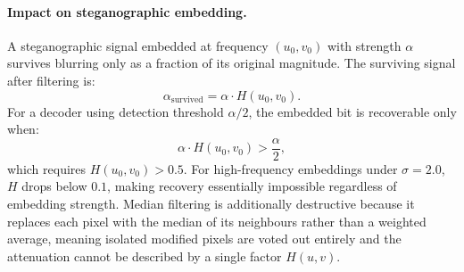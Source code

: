 \documentclass[12pt,a4paper,oneside]{report}
\begin{document}
	\paragraph{Impact on steganographic embedding.}
	A steganographic signal embedded at frequency $(u_0, v_0)$ with 
	strength $\alpha$ survives blurring only as a fraction of its 
	original magnitude. The surviving signal after filtering is:
	\begin{equation}
		\alpha_{\text{survived}} = \alpha \cdot H(u_0, v_0).
		\label{eq:survived}
	\end{equation}
	For a decoder using detection threshold $\alpha/2$, the embedded 
	bit is recoverable only when:
	\begin{equation}
		\alpha \cdot H(u_0, v_0) > \frac{\alpha}{2},
	\end{equation}
	which requires $H(u_0, v_0) > 0.5$. For high-frequency embeddings 
	under $\sigma = 2.0$, $H$ drops below $0.1$, making recovery 
	essentially impossible regardless of embedding strength. Median 
	filtering is additionally destructive because it replaces each 
	pixel with the median of its neighbours rather than a weighted 
	average, meaning isolated modified pixels are voted out entirely 
	and the attenuation cannot be described by a single factor $H(u,v)$.
	
%	
	
\end{document}
